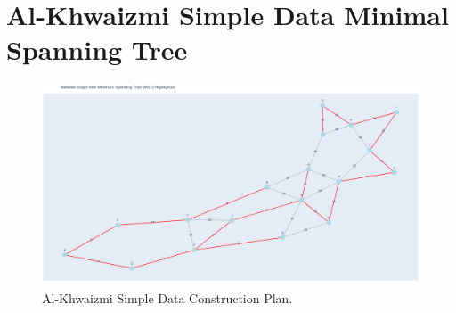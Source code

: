 \documentclass[11pt]{book}
\renewcommand{\=}[1]{\stackrel{#1}{=}} %
\theoremstyle{definition}
\theoremstyle{remark}
\begin{document}
\section{Al-Khwaizmi Simple Data Minimal Spanning Tree}
\begin{figure}
    \centering
    \includegraphics[width=1\linewidth]{img/MST Al-Khwaizmi Simple Data.png}
    \caption{Al-Khwaizmi Simple Data Construction Plan.}
    \label{fig:enter-label}
\end{figure}
\end{document}
